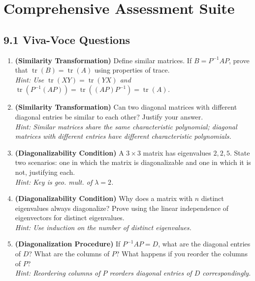 \documentclass[12pt,a4paper]{article}
\begin{document}
\section{Comprehensive Assessment Suite}

\subsection*{9.1 Viva-Voce Questions}

\begin{enumerate}[leftmargin=*, label=\textbf{V\arabic*.}]
  \item \textbf{(Similarity Transformation)} Define similar matrices. If $B = P^{-1}AP$, prove that $\operatorname{tr}(B) = \operatorname{tr}(A)$ using properties of trace. \\
  \textit{Hint: Use $\operatorname{tr}(XY) = \operatorname{tr}(YX)$ and $\operatorname{tr}(P^{-1}(AP)) = \operatorname{tr}((AP)P^{-1}) = \operatorname{tr}(A)$.}

  \item \textbf{(Similarity Transformation)} Can two diagonal matrices with different diagonal entries be similar to each other? Justify your answer. \\
  \textit{Hint: Similar matrices share the same characteristic polynomial; diagonal matrices with different entries have different characteristic polynomials.}

  \item \textbf{(Diagonalizability Condition)} A $3\times 3$ matrix has eigenvalues $2, 2, 5$. State two scenarios: one in which the matrix is diagonalizable and one in which it is not, justifying each. \\
  \textit{Hint: Key is geo. mult. of $\lambda=2$.}

  \item \textbf{(Diagonalizability Condition)} Why does a matrix with $n$ distinct eigenvalues always diagonalize? Prove using the linear independence of eigenvectors for distinct eigenvalues. \\
  \textit{Hint: Use induction on the number of distinct eigenvalues.}

  \item \textbf{(Diagonalization Procedure)} If $P^{-1}AP = D$, what are the diagonal entries of $D$? What are the columns of $P$? What happens if you reorder the columns of $P$? \\
  \textit{Hint: Reordering columns of $P$ reorders diagonal entries of $D$ correspondingly.}


\end{enumerate}
\end{document}
